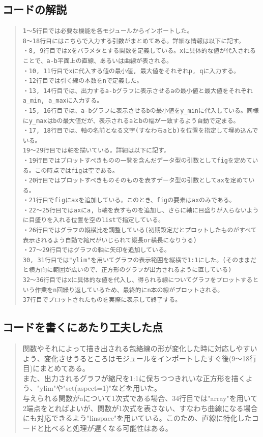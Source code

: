 \documentclass[11pt,a4j,fleqn]{jarticle}
\begin{document}
\subsection{コードの解説}
\begin{quote}
\begin{verbatim}
1～5行目では必要な機能を各モジュールからインポートした。
8～18行目にはこちらで入力する引数がまとめてある。詳細な情報は以下に記す。
・8, 9行目ではxをパラメタとする関数を定義している。xに具体的な値が代入されることで、a-b平面上の直線、あるいは曲線が表される。
・10, 11行目でxに代入する値の最小値, 最大値をそれぞれp, qに入力する。
・12行目では引く線の本数をnで定義した。
・13, 14行目では、出力するa-bグラフに表示させるaの最小値と最大値をそれぞれa_min, a_maxに入力する。
・15, 16行目では、a-bグラフに表示させるbの最小値をy_minに代入している。同様にy_maxはbの最大値だが、表示されるaとbの幅が一致するよう自動で定まる。
・17, 18行目では、軸の名前となる文字(すなわちaとb)を位置を指定して埋め込んでいる。
19～29行目では軸を描いている。詳細は以下に記す。
・19行目ではプロットすべきものの一覧を含んだデータ型の引数としてfigを定めている。この時点ではfigは空である。
・20行目ではプロットすべきものそのものを表すデータ型の引数としてaxを定めている。
・21行目でfigにaxを追加している。このとき、figの要素はaxのみである。
・22～25行目ではaxにa, b軸を表すものを追加し、さらに軸に目盛りが入らないように目盛りを入れる位置を空のlistで指定している。
・26行目ではグラフの縦横比を調整している(初期設定だとプロットしたものがすべて表示されるよう自動で縮尺がいじられて縦長or横長になりうる)
・27～29行目ではグラフの軸に矢印を追加している。
30, 31行目では"ylim"を用いてグラフの表示範囲を縦横で1:1にした。(そのままだと横方向に範囲が広いので、正方形のグラフが出力されるように直している)
32～36行目ではxに具体的な値を代入し、得られる線についてグラフをプロットするという作業をn回繰り返しているため、最終的にn本の線がプロットされる。
37行目でプロットされたものを実際に表示して終了する。
\end{verbatim}
\end{quote}

\subsection{コードを書くにあたり工夫した点}
\begin{quote}
関数やそれによって描き出される包絡線の形が変化した時に対応しやすいよう、変化させうるところはモジュールをインポートしたすぐ後(9～18行目)にまとめてある。\\
また、出力されるグラフが縮尺を1:1に保ちつつきれいな正方形を描くよう、"ylim"や"set(aspect=1)"などを用いた。\\
与えられる関数がaについて1次式である場合、34行目では"array"を用いて2端点をとればよいが、関数が1次式を表さない、すなわち曲線になる場合にも対応できるよう"linspace"を用いている。このため、直線に特化したコードと比べると処理が遅くなる可能性はある。
\end{quote}
\end{document}
